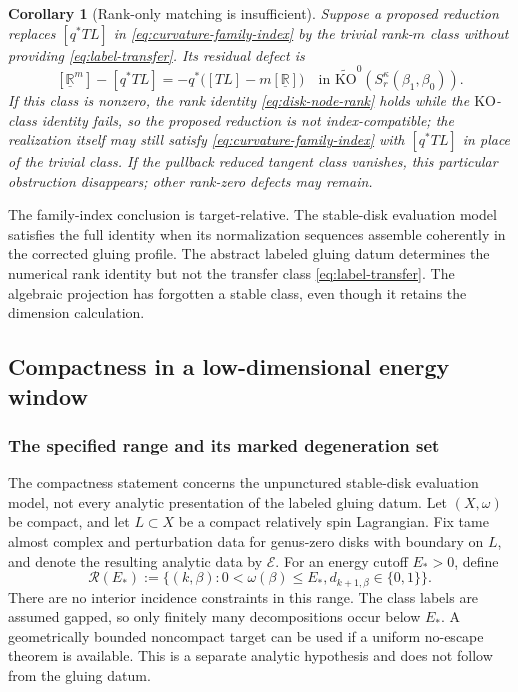 \documentclass[11pt,letterpaper,twoside]{article}
\theoremstyle{plain}
\newtheorem{corollary}[theorem]{Corollary}
\theoremstyle{definition}
\theoremstyle{remark}
\begin{document}
\begin{corollary}[Rank-only matching is insufficient]\label{cor:curvature-rank-zero-defect}
Suppose a proposed reduction replaces \([q^*TL]\) in \eqref{eq:curvature-family-index} by the trivial rank-\(m\) class without providing \eqref{eq:label-transfer}.  Its residual defect is
\begin{equation}\label{eq:tangent-rank-zero-defect}
 [\underline{\mathbb R}^{m}]-[q^*TL]
 =-q^*\bigl([TL]-m[\underline{\mathbb R}]\bigr)
 \quad\text{in }\widetilde{\mathrm{KO}}^0(S^\kappa_r(\beta_1,\beta_0)).
\end{equation}
If this class is nonzero, the rank identity \eqref{eq:disk-node-rank} holds while the $\mathrm{KO}$-class identity fails, so the proposed reduction is not index-compatible; the realization itself may still satisfy \eqref{eq:curvature-family-index} with $[q^*TL]$ in place of the trivial class.  If the pullback reduced tangent class vanishes, this particular obstruction disappears; other rank-zero defects may remain.
\end{corollary}

The family-index conclusion is target-relative.  The stable-disk evaluation model satisfies the full identity when its normalization sequences assemble coherently in the corrected gluing profile.  The abstract labeled gluing datum determines the numerical rank identity but not the transfer class \eqref{eq:label-transfer}.  The algebraic projection has forgotten a stable class, even though it retains the dimension calculation.

\subsection{Compactness in a low-dimensional energy window}\label{sec:curved-compactness}

\subsubsection{The specified range and its marked degeneration set}

The compactness statement concerns the unpunctured stable-disk evaluation model, not every analytic presentation of the labeled gluing datum.  Let $(X,\omega)$ be compact, and let $L\subset X$ be a compact relatively spin Lagrangian.  Fix tame almost complex and perturbation data for genus-zero disks with boundary on $L$, and denote the resulting analytic data by $\mathcal E$.  For an energy cutoff $E_*>0$, define
\begin{equation}\label{eq:curvature-compactness-range}
 \mathcal R(E_*)
 :=\bigl\{(k,\beta):0<\omega(\beta)\leq E_*,
 d_{k+1,\beta}\in\{0,1\}\bigr\}.
\end{equation}
There are no interior incidence constraints in this range.  The class labels are assumed gapped, so only finitely many decompositions occur below $E_*$.  A geometrically bounded noncompact target can be used if a uniform no-escape theorem is available.  This is a separate analytic hypothesis and does not follow from the gluing datum.
\end{document}
